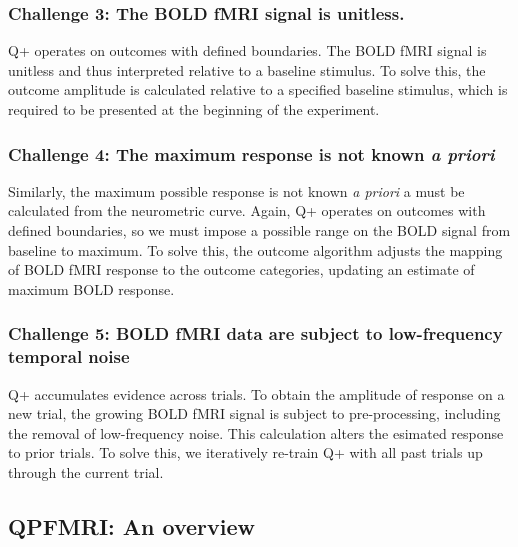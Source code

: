 \documentclass[
  man,floatsintext]{apa6}
\begin{document}
\hypertarget{challenge-3-the-bold-fmri-signal-is-unitless.}{%
\subsubsection{Challenge 3: The BOLD fMRI signal is unitless.}\label{challenge-3-the-bold-fmri-signal-is-unitless.}}

Q+ operates on outcomes with defined boundaries. The BOLD fMRI signal is unitless and thus interpreted relative to a baseline stimulus. To solve this, the outcome amplitude is calculated relative to a specified baseline stimulus, which is required to be presented at the beginning of the experiment.

\hypertarget{challenge-4-the-maximum-response-is-not-known-a-priori}{%
\subsubsection{\texorpdfstring{Challenge 4: The maximum response is not known \emph{a priori}}{Challenge 4: The maximum response is not known a priori}}\label{challenge-4-the-maximum-response-is-not-known-a-priori}}

Similarly, the maximum possible response is not known \emph{a priori} a must be calculated from the neurometric curve. Again, Q+ operates on outcomes with defined boundaries, so we must impose a possible range on the BOLD signal from baseline to maximum. To solve this, the outcome algorithm adjusts the mapping of BOLD fMRI response to the outcome categories, updating an estimate of maximum BOLD response.

\hypertarget{challenge-5-bold-fmri-data-are-subject-to-low-frequency-temporal-noise}{%
\subsubsection{Challenge 5: BOLD fMRI data are subject to low-frequency temporal noise}\label{challenge-5-bold-fmri-data-are-subject-to-low-frequency-temporal-noise}}

Q+ accumulates evidence across trials. To obtain the amplitude of response on a new trial, the growing BOLD fMRI signal is subject to pre-processing, including the removal of low-frequency noise. This calculation alters the esimated response to prior trials. To solve this, we iteratively re-train Q+ with all past trials up through the current trial.

\hypertarget{qpfmri-an-overview}{%
\subsection{QPFMRI: An overview}\label{qpfmri-an-overview}}
\end{document}

